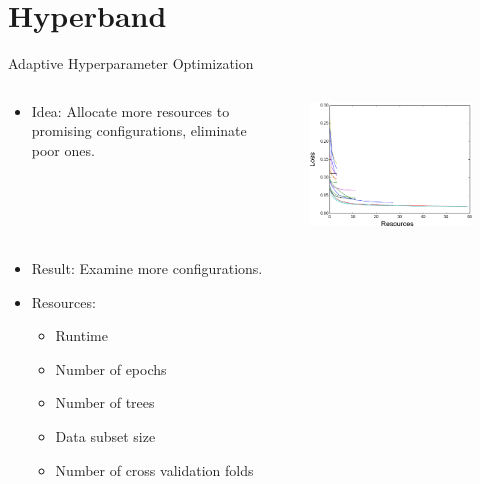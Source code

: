 \section{Hyperband}


\begin{frame}{Adaptive Hyperparameter Optimization}
\begin{columns}[T]

\begin{column}{.45\textwidth}
    \begin{itemize}
        \item Idea: Allocate more resources to promising configurations, eliminate poor ones.
        \pause
    \end{itemize}
\end{column}
    \begin{column}{.45\linewidth}
    \begin{figure}
    \centering
    \includegraphics[width=0.9\linewidth]{images/hyperband/Figure_1_2.png}
\end{figure}
    \end{column}
    \end{columns}
    \begin{columns}
    
    \begin{column}{.45\linewidth}
    \vspace{-9em}
    \begin{itemize}
	\item Result: Examine more configurations.
	\pause
	\item Resources:
	\pause
	\begin{itemize}
	    \item Runtime
	    \pause
	    \item Number of epochs
	    \pause
	    \item Number of trees
	    \pause
	    \item Data subset size
	    \pause
	    \item Number of cross validation folds
	    

\end{itemize}
\end{itemize}
\end{column}
\end{columns}
\end{frame}
